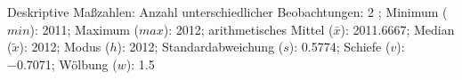                     \begin{noten}
                	    \note{} Deskriptive Maßzahlen:
                	    Anzahl unterschiedlicher Beobachtungen: 2%
                	    ; 
                	      Minimum ($min$): 2011; 
                	      Maximum ($max$): 2012; 
                	      arithmetisches Mittel ($\bar{x}$): \num[round-mode=places,round-precision=2]{2011.6667}; 
                	      Median ($\tilde{x}$): 2012; 
                	      Modus ($h$): 2012; 
                	      Standardabweichung ($s$): \num[round-mode=places,round-precision=2]{0.5774}; 
                	      Schiefe ($v$): \num[round-mode=places,round-precision=2]{-0.7071}; 
                	      Wölbung ($w$): \num[round-mode=places,round-precision=2]{1.5}
                     \end{noten}

